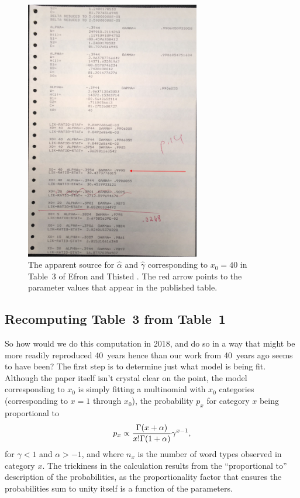 \begin{figure}
	\centering
	\includegraphics[width=3in]{Photos/Table3-output-5037a.jpg}
	\caption{The apparent source for $\hat\alpha$ and $\hat\gamma$ corresponding to $x_0=40$ in Table~3 of Efron and Thisted \citeyear{Efron:1976zs}.  The red arrow points to the parameter values that appear in the published table. }
	\label{fig:Table3-output-5037a}
\end{figure}


\subsection{Recomputing Table~3 from Table~1} %
\label{sub:recomputing_table_3_from_table_1}

	So how would we do this computation in 2018, and do so in a way that might be more readily reproduced 40~years hence than our work from 40~years ago seems to have been?  The first step is to determine just what model is being fit.  Although the paper itself isn't crystal clear on the point, the model corresponding to $x_0$ is simply fitting a multinomial with $x_0$ categories (corresponding to $x=1$ through $x_0$), the probability $p_x$ for category $x$ being proportional to
$$
p_x \propto {\Gamma(x+\alpha) \over x! \Gamma(1+\alpha)}\gamma^{x-1},
$$
for $\gamma<1$ and $\alpha>-1$, and where $n_x$ is the number of word types observed in category $x$.  The trickiness in the calculation results from the ``proportional to'' description of the probabilities, as the proportionality factor that ensures the probabilities sum to unity itself is a function of the parameters. 
	
